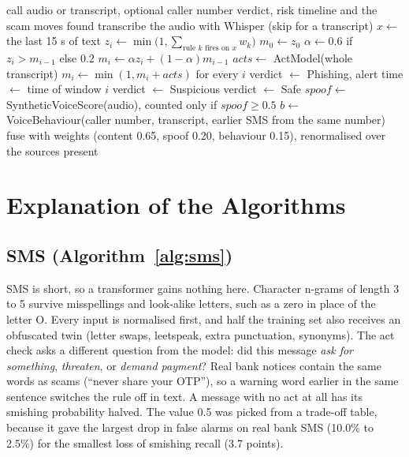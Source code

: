 {\begin{algorithm}[H]
\caption{Scoring a call}\label{alg:voice}
\begin{algorithmic}[1]
\REQUIRE call audio or transcript, optional caller number
\ENSURE verdict, risk timeline and the scam moves found
\STATE transcribe the audio with Whisper (skip for a transcript)
  \STATE $x \leftarrow$ the last 15 s of text
  \STATE $z_i \leftarrow \min\bigl(1, \sum_{\text{rule } k \text{ fires on } x} w_k \bigr)$ 
\ENDFOR
\STATE $m_0 \leftarrow z_0$
  \STATE $\alpha \leftarrow 0.6$ if $z_i > m_{i-1}$ else $0.2$ 
  \STATE $m_i \leftarrow \alpha z_i + (1-\alpha) m_{i-1}$
\ENDFOR
\STATE $acts \leftarrow$ ActModel(whole transcript) 
\STATE $m_i \leftarrow \min(1, m_i + acts)$ for every $i$
  \STATE verdict $\leftarrow$ Phishing, alert time $\leftarrow$ time of window $i$
  \STATE verdict $\leftarrow$ Suspicious
\ELSE
  \STATE verdict $\leftarrow$ Safe
\ENDIF
\STATE $spoof \leftarrow$ SyntheticVoiceScore(audio), counted only if $spoof \ge 0.5$
\STATE $b \leftarrow$ VoiceBehaviour(caller number, transcript, earlier SMS from the same number)
\STATE \RETURN fuse with weights (content 0.65, spoof 0.20, behaviour 0.15), renormalised over the sources present
\end{algorithmic}
\end{algorithm}

\section{Explanation of the Algorithms}\label{sec:algx}

\subsection{SMS (Algorithm~\ref{alg:sms})}
SMS is short, so a transformer gains nothing here. Character n-grams of length 3 to 5 survive misspellings and look-alike letters, such as a zero in place of the letter O. Every input is normalised first, and half the training set also receives an obfuscated twin (letter swaps, leetspeak, extra punctuation, synonyms). The act check asks a different question from the model: did this message \emph{ask for something}, \emph{threaten}, or \emph{demand payment}? Real bank notices contain the same words as scams (``never share your OTP''), so a warning word earlier in the same sentence switches the rule off in text. A message with no act at all has its smishing probability halved. The value 0.5 was picked from a trade-off table, because it gave the largest drop in false alarms on real bank SMS (10.0\% to 2.5\%) for the smallest loss of smishing recall (3.7 points).

}
